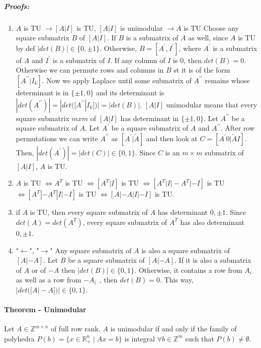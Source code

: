 \documentclass[main]{subfiles}
\begin{document}
\subparagraph{Proofs:}
\begin{enumerate}
\item $A$ is TU $\rightarrow [A|I]$ is TU, $[A|I]$ is unimodular $\rightarrow
A$ is TU
\subitem Choose any square submatrix $B$ of $[A|I]$. If $B$ is a submatrix of
$A$ as well, since $A$ is TU by def $|det(B)| \in \{0,\pm 1\}$. Otherwise,
$B = [A^\prime, I^\prime]$, where $A^\prime$ is a submatrix of $A$ and
$I^\prime$ is a submatrix of $I$. If any column of $I$ is $0$, then $det(B)=0$.
Otherwise we can permute rows and columns in $B$ st it is of the form
$[A^{\prime\prime} | I_k]$. Now we apply Laplace until some submatrix of
$A^{\prime\prime}$ remains whose determinant is in $\{\pm 1, 0\}$ and its
determinant is $|det(A^{\prime\prime})| = |det([A^{\prime\prime} | I_k])| =
|det(B)|$.
\subitem $[A|I]$ unimodular means that every square submatrix $mxm$ of $[A|I]$
has determinant in $\{\pm 1, 0\}$. Let $A^{\prime\prime}$ be a square submatrix
of $A$. Let $A^\prime$ be a square submatrix of $A$ and $A^{\prime\prime}$.
After row permutations we can write $A^{\prime\prime}$ as $[A^\prime |
\tilde{A}]$ and then look at $C = [A^\prime 0 | \tilde{A} I ]$. Then,
$|det(A^\prime)| = |det(C)| \in \{0,1\}$. Since $C$ is an $m \times m$
submatrix of $[A|I]$, $A$ is TU.
\item $A$ is TU $\iff A^T$ is TU $\iff [A^T |I]$ is TU $\iff [A^T | I | -A^T |
-I]$ is TU $\iff [A^T | -A^T | I | -I]$ is TU $\iff [A | -A | I | -I]$ is TU.
\item if $A$ is TU, then every square submatrix of $A$ has determinant $0, \pm
1$. Since $det(A) = det(A^T)$, every square submatrix of $A^T$ has also
determinant $0, \pm 1$.
\item "$\leftarrow$", "$\rightarrow$"
\subitem Any square submatrix of $A$ is also a square submatrix of $[A|-A]$.
\subitem Let $B$ be a square submatrix of $[A|-A]$. If it is also a submatrix
of $A$ or of $-A$ then $|det(B)| \in \{0,1\}$. Otherwise, it contains a row
from $A_{i\cdot}$ as well as a row from $-A_{i\cdot}$, then $det(B) = 0$.
This way, $|det([A|-A])| \in \{0,1\}$.
\end{enumerate}

\paragraph{Theorem - Unimodular}
Let $A \in \mathbb{Z}^{m \times n}$ of full row rank. $A$ is unimodular if and
only if the family of polyhedra $P(b) = \{ x \in \mathbb{R}^{n}_+ \mid Ax = b
\}$ is integral $\forall b \in \mathbb{Z}^{m}$ such that $P(b) \neq \emptyset$.
\end{document}

